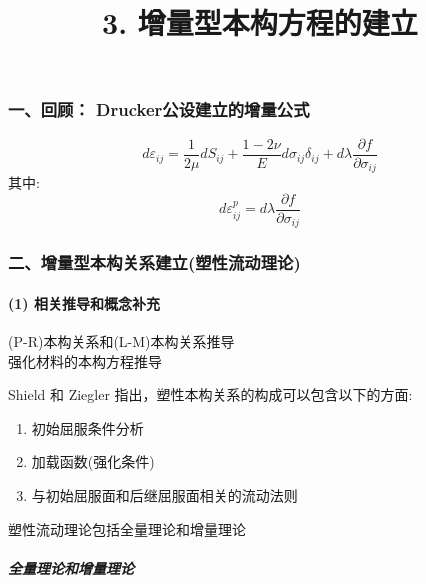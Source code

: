 \documentclass[UTF8]{ctexart}
\title{3. 增量型本构方程的建立}
\author{}
\date{}
\providecommand{\tightlist}{%
  \setlength{\itemsep}{0pt}\setlength{\parskip}{0pt}}
\begin{document}
\maketitle

\hypertarget{ux4e00ux56deux987e-druckerux516cux8bbeux5efaux7acbux7684ux589eux91cfux516cux5f0f}{%
\subsubsection{一、回顾：
Drucker公设建立的增量公式}\label{ux4e00ux56deux987e-druckerux516cux8bbeux5efaux7acbux7684ux589eux91cfux516cux5f0f}}

{\[d\varepsilon_{ij} = \frac{1}{2\mu}dS_{ij} + \frac{1 - 2\nu}{E}d\sigma_{ij}\delta_{ij} + d\lambda\frac{\partial f}{\partial\sigma_{ij}}\]}其中:\\
{\[d\varepsilon_{ij}^{p} = d\lambda\frac{\partial f}{\partial\sigma_{ij}}\]}

\hypertarget{ux4e8cux589eux91cfux578bux672cux6784ux5173ux7cfbux5efaux7acbux5851ux6027ux6d41ux52a8ux7406ux8bba}{%
\subsubsection{二、增量型本构关系建立(塑性流动理论)}\label{ux4e8cux589eux91cfux578bux672cux6784ux5173ux7cfbux5efaux7acbux5851ux6027ux6d41ux52a8ux7406ux8bba}}

\hypertarget{ux76f8ux5173ux63a8ux5bfcux548cux6982ux5ff5ux8865ux5145}{%
\paragraph{(1)
相关推导和概念补充}\label{ux76f8ux5173ux63a8ux5bfcux548cux6982ux5ff5ux8865ux5145}}

(P-R)本构关系和(L-M)本构关系推导\\
强化材料的本构方程推导

Shield 和 Ziegler 指出，塑性本构关系的构成可以包含以下的方面:

\begin{enumerate}
\tightlist
\item
  初始屈服条件分析
\item
  加载函数(强化条件)
\item
  与初始屈服面和后继屈服面相关的流动法则
\end{enumerate}

塑性流动理论包括全量理论和增量理论

\hypertarget{ux5168ux91cfux7406ux8bbaux548cux589eux91cfux7406ux8bba}{%
\subparagraph{全量理论和增量理论}\label{ux5168ux91cfux7406ux8bbaux548cux589eux91cfux7406ux8bba}}
\end{document}
